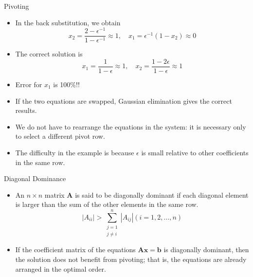 \documentclass{beamer}
\newcommand{\beforeverb}{\footnotesize}
\newcommand{\afterverb}{\normalsize}
\begin{document}
\begin{frame}{Pivoting}
\begin{itemize}
\item In the back substitution, we obtain
\beforeverb
\[
x_2=\frac{2-\epsilon ^{-1}}{1-\epsilon ^{-1}}\approx 1, \quad x_1=\epsilon ^{-1}(1-x_2)\approx 0
\]
\afterverb
\item The correct solution is 
\beforeverb
\[
x_1=\frac{1}{1-\epsilon}\approx 1, \quad x_2=\frac{1-2\epsilon}{1-\epsilon}\approx 1
\]
\afterverb
\item Error for $x_1$ is 100\%!!
\item If the two equations are swapped, Gaussian elimination gives the correct results.
\item We do not have to rearrange the equations in the system: it is necessary only to select a \alert{different pivot row}. 
\item The difficulty in the example is because $\epsilon$ is small relative to other coefficients in the same row.
\end{itemize}
\end{frame}
\begin{frame}{Diagonal Dominance}
  \begin{itemize}
    \item An $n\times n$ matrix $\mathbf{A}$ is said to be diagonally dominant if each diagonal element is larger than the sum of the other elements in the same row.
    $$
  \left|A_{i i}\right|>\sum_{\substack{j=1 \\ j \neq i}}^n\left|A_{i j}\right|(i=1,2, \ldots, n)
  $$
  \item If the coefficient matrix of the equations $\mathbf{Ax} = \mathbf{b}$ is diagonally
  dominant, then the solution does not benefit from pivoting; that is, the equations are already arranged in the optimal order. 
  \end{itemize}
  \end{frame}
\end{document}
